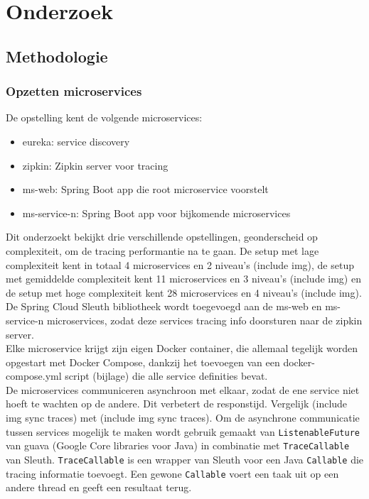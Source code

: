 
\chapter{Onderzoek}
\label{ch:onderzoek}

\section{Methodologie}
\label{sec:methodologie}

\subsection{Opzetten microservices}
\label{sec:opzetten}

De opstelling kent de volgende microservices:
\begin{itemize}
\item eureka: service discovery
\item zipkin: Zipkin server voor tracing
\item ms-web: Spring Boot app die root microservice voorstelt
\item ms-service-n: Spring Boot app voor bijkomende microservices 
\end{itemize}

Dit onderzoekt bekijkt drie verschillende opstellingen, geonderscheid op complexiteit, om de tracing performantie na te gaan. De setup met lage complexiteit kent in totaal 4 microservices en 2 niveau's (include img), de setup met gemiddelde complexiteit kent 11 microservices en 3 niveau's (include img) en de setup met hoge complexiteit kent 28 microservices en 4 niveau's (include img). \\

De Spring Cloud Sleuth bibliotheek wordt toegevoegd aan de ms-web en ms-service-n microservices, zodat deze services tracing info doorsturen naar de zipkin server. \\

Elke microservice krijgt zijn eigen Docker container, die allemaal tegelijk worden opgestart met Docker Compose, dankzij het toevoegen van een docker-compose.yml script (bijlage) die alle service definities bevat. \\

De microservices communiceren asynchroon met elkaar, zodat de ene service niet hoeft te wachten op de andere. Dit verbetert de responstijd. Vergelijk (include img sync traces) met (include img sync traces). Om de asynchrone communicatie tussen services mogelijk te maken wordt gebruik gemaakt van \texttt{ListenableFuture} van guava (Google Core libraries voor Java) in combinatie met \texttt{TraceCallable} van Sleuth. \texttt{TraceCallable} is een wrapper van Sleuth voor een Java \texttt{Callable} die tracing informatie toevoegt. Een gewone \texttt{Callable} voert een taak uit op een andere thread en geeft een resultaat terug.

